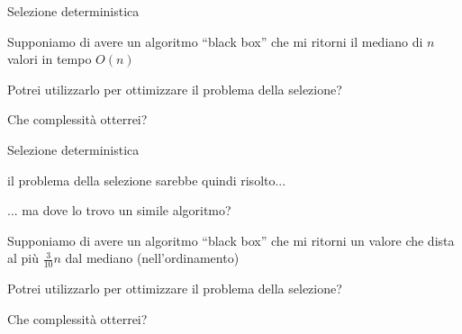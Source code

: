\begin{frame}{Selezione deterministica}

\vspace{-9pt}
\begin{myboxtitle}
Supponiamo di avere un algoritmo “black box” che mi ritorni il mediano di $n$ valori in tempo $O(n)$
\end{myboxtitle}

\begin{myboxtitle}[Domande]
\BIL
\item Potrei utilizzarlo per ottimizzare il problema della selezione?
\item Che complessità otterrei?
\EIL
\end{myboxtitle}

\end{frame}

\begin{frame}{Selezione deterministica}

\vspace{-9pt}
\begin{myboxtitle}
\BIL
\item il problema della selezione sarebbe quindi risolto...
\item ... ma dove lo trovo un simile algoritmo?
\EIL
\end{myboxtitle}

\begin{myboxtitle}
\BIL
\item Supponiamo di avere un algoritmo “black box” che mi ritorni un valore che dista al più $\frac{3}{10}n$ dal mediano (nell'ordinamento)
\item Potrei utilizzarlo per ottimizzare il problema della selezione?
\item Che complessità otterrei?
\EIL
\end{myboxtitle}

\end{frame}

